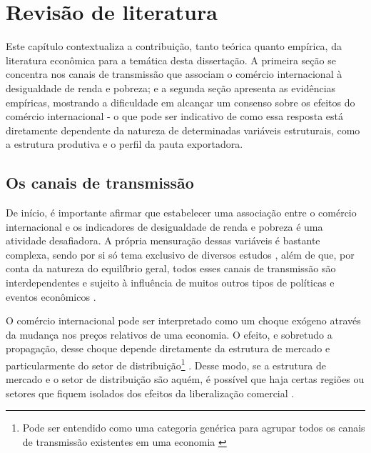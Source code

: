 

\chapter{Revisão de literatura} \label{cha:revisão_de_literatura}

Este capítulo contextualiza a contribuição, tanto teórica quanto empírica, da literatura econômica para a temática desta dissertação. A primeira seção se concentra nos canais de transmissão que associam o comércio internacional à desigualdade de renda e pobreza; e a segunda seção apresenta as evidências empíricas, mostrando a dificuldade em alcançar um consenso sobre os efeitos do comércio internacional - o que pode ser indicativo de como essa resposta está diretamente dependente da natureza de determinadas variáveis estruturais, como a estrutura produtiva e o perfil da pauta exportadora.


\section{Os canais de transmissão} \label{sec:canais_transmissao}

De início, é importante afirmar que estabelecer uma associação entre o comércio internacional e os indicadores de desigualdade de renda e pobreza é uma atividade desafiadora. A própria mensuração dessas variáveis é bastante complexa, sendo por si só tema exclusivo de diversos estudos \cite{neri06, soares09, hoffmann19}, além de que, por conta da natureza do equilíbrio geral, todos esses canais de transmissão são interdependentes e sujeito à influência de muitos outros tipos de políticas e eventos econômicos \cite{bannisterthugge01}.

O comércio internacional pode ser interpretado como um choque exógeno através da mudança nos preços relativos de uma economia. O efeito, e sobretudo a propagação, desse choque depende diretamente da estrutura de mercado e particularmente do setor de distribuição\footnote{Pode ser entendido como uma categoria genérica para agrupar todos os canais de transmissão existentes em uma economia \cite{winters02}} \cite{winters02}. Desse modo, se a estrutura de mercado e o setor de distribuição são aquém, é possível que haja certas regiões ou setores que fiquem isolados dos efeitos da liberalização comercial \cite{bannisterthugge01}.

